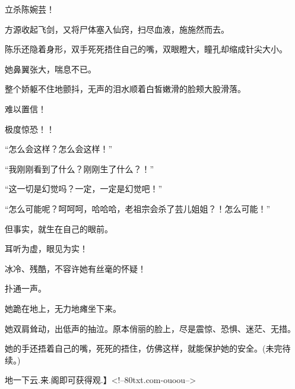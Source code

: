 \begin{this_body}
立杀陈婉芸！

方源收起飞剑，又将尸体塞入仙窍，扫尽血液，施施然而去。

陈乐还隐着身形，双手死死捂住自己的嘴，双眼瞪大，瞳孔却缩成针尖大小。

她鼻翼张大，喘息不已。

整个娇躯不住地颤抖，无声的泪水顺着白皙嫩滑的脸颊大股滑落。

难以置信！

极度惊恐！！

“怎么会这样？怎么会这样！”

“我刚刚看到了什么？刚刚生了什么？！”

“这一切是幻觉吗？一定，一定是幻觉吧！”

“怎么可能呢？呵呵呵，哈哈哈，老祖宗会杀了芸儿姐姐？！怎么可能！”

但事实，就生在自己的眼前。

耳听为虚，眼见为实！

冰冷、残酷，不容许她有丝毫的怀疑！

扑通一声。

她跪在地上，无力地瘫坐下来。

她双肩耸动，出低声的抽泣。原本俏丽的脸上，尽是震惊、恐惧、迷茫、无措。

她的手还捂着自己的嘴，死死的捂住，仿佛这样，就能保护她的安全。(未完待续。)

地一下云.来.阁即可获得观.】<!--80txt.com-ouoou-->

\end{this_body}

